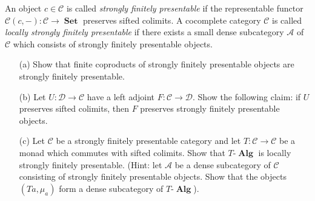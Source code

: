 \documentclass[12pt, a4paper]{article}
\DeclareMathOperator{\Alg}{\mathbf{Alg}}
\DeclareMathOperator{\Set}{\mathbf{Set}}
\newcommand{\ca}[1]{\mathscr{#1}}
\theoremstyle{plain}
\theoremstyle{definition}
\theoremstyle{citing}
\theoremstyle{citingdfn}
\numberwithin{equation}{section}
\begin{document}
\begin{question}[subtitle=(bonus)]
 An object $c \in \ca{C}$ is called \emph{strongly finitely presentable} if the representable functor $\ca{C}(c,-) \colon \ca{C} \rightarrow \Set$ preserves sifted colimits. A cocomplete category $\ca{C}$ is called \emph{locally strongly finitely presentable} if there exists a small dense subcategory $\ca{A}$ of $\ca{C}$ which consists of strongly finitely presentable objects.
 
 \begin{enumerate}
 \item[(a)] Show that finite coproducts of strongly finitely presentable objects are strongly finitely presentable.
 
 \item[(b)] Let $U \colon \ca{D} \rightarrow \ca{C}$ have a left adjoint $F \colon \ca{C} \rightarrow \ca{D}$. Show the following claim: if $U$ preserves sifted colimits, then $F$ preserves strongly finitely presentable objects.
 
 \item[(c)] Let $\ca{C}$ be a strongly finitely presentable category and let $T \colon \ca{C} \rightarrow \ca{C}$ be a monad which commutes with sifted colimits. Show that $T\mbox{-}\Alg$ is locally strongly finitely presentable. (Hint: let $\ca{A}$ be a dense subcategory of $\ca{C}$ consisting of strongly finitely presentable objects. Show that the objects $(Ta,\mu_a)$ form a dense subcategory of $T\mbox{-}\Alg$).
 \end{enumerate}
\end{question}
\end{document}
